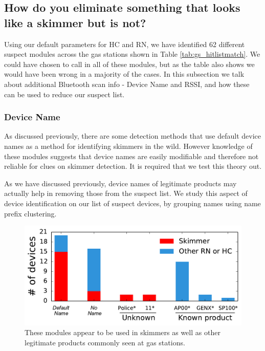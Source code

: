 \subsection {How do you eliminate something that looks like a skimmer but is not?}

Using our default parameters for HC and RN, we have identified 62 different suspect modules across the gas stations shown in Table \ref{tab:gs_hitlistmatch}. We could have chosen to call in all of these modules, but as the table also shows we would have been wrong in a majority of the cases. In this subsection we talk about additional Bluetooth scan info - Device Name and RSSI, and how these can be used to reduce our suspect list.

\subsubsection{Device Name}
As discussed previously, there are some detection methods that use default device names as a method for identifying skimmers in the wild. However knowledge of these modules suggests that device names are easily modifiable and therefore not reliable for clues on skimmer detection. It is required that we test this theory out.

As we have discussed previously, device names of legitimate products may actually help in removing those from the suspect list. We study this aspect of device identification on our list of suspect devices, by grouping names using name prefix clustering.

\begin{figure}
\centering
\includegraphics[width=\linewidth]{plots/bar_plot_name_cluster.pdf}
\caption{
  \label{fig:barplot_name_cluster}
  These modules appear to be used in skimmers as well as other legitimate products commonly seen at gas stations. 
}
\end{figure}

